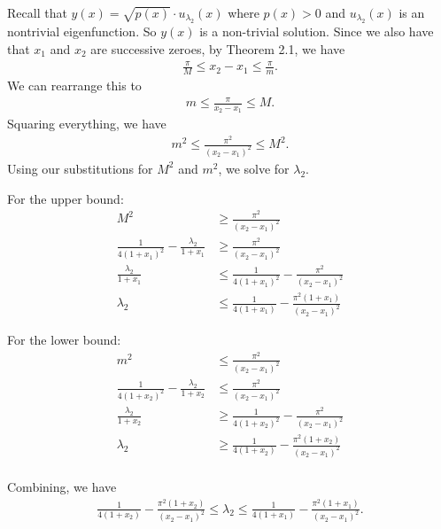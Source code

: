\documentclass[12pt]{article}
\begin{document}
Recall that $y(x) = \sqrt{p(x)} \cdot u_{\lambda_2}(x)$ where $p(x) >0$ and $u_{\lambda_2}(x)$ is an nontrivial eigenfunction.
So $y(x)$ is a non-trivial solution.
Since we also have that $x_1$ and $x_2$ are successive zeroes, by Theorem 2.1, we have
\begin{align*}
    \frac{\pi}{M} \leq x_2 - x_1 \leq \frac{\pi}{m}.
\end{align*}
We can rearrange this to
\begin{align*}
    m \leq \frac{\pi}{x_2 - x_1} \leq M.
\end{align*}
Squaring everything, we have
\begin{align*}
    m^2 \leq \frac{\pi^2}{(x_2 - x_1)^2} \leq M^2.
\end{align*}
Using our substitutions for $M^2$ and $m^2$, we solve for $\lambda_2$.

For the upper bound:
\begin{align*}
    M^2                                            & \geq \frac{\pi^2}{(x_2 - x_1)^2}                            \\
    \frac{1}{4(1+x_1)^2} - \frac{\lambda_2}{1+x_1} & \geq \frac{\pi^2}{(x_2 - x_1)^2}                            \\
    \frac{\lambda_2}{1+x_1}                        & \leq \frac{1}{4(1+x_1)^2} - \frac{\pi^2}{(x_2 - x_1)^2}     \\
    \lambda_2                                      & \leq \frac{1}{4(1+x_1)}- \frac{\pi^2(1+x_1)}{(x_2 - x_1)^2}
\end{align*}

For the lower bound:
\begin{align*}
    m^2                                            & \leq \frac{\pi^2}{(x_2 - x_1)^2}                            \\
    \frac{1}{4(1+x_2)^2} - \frac{\lambda_2}{1+x_2} & \leq \frac{\pi^2}{(x_2 - x_1)^2}                            \\
    \frac{\lambda_2}{1+x_2}                        & \geq \frac{1}{4(1+x_2)^2} -\frac{\pi^2}{(x_2 - x_1)^2}      \\
    \lambda_2                                      & \geq \frac{1}{4(1+x_2)} -\frac{\pi^2(1+x_2)}{(x_2 - x_1)^2} \\
\end{align*}

Combining, we have
\begin{align*}
    \frac{1}{4(1+x_2)} -\frac{\pi^2(1+x_2)}{(x_2 - x_1)^2}  \leq \lambda_2 \leq \frac{1}{4(1+x_1)}- \frac{\pi^2(1+x_1)}{(x_2 - x_1)^2}.
\end{align*}
\end{document}
